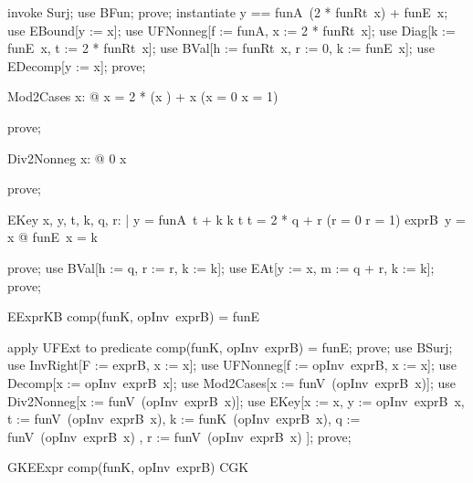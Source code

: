 \documentclass{article}
\begin{document}
\begin{zproof}
invoke Surj;
use BFun;
prove;
instantiate y == funA~(2 * funRt~x) + funE~x;
use EBound[y := x];
use UFNonneg[f := funA, x := 2 * funRt~x];
use Diag[k := funE~x, t := 2 * funRt~x];
use BVal[h := funRt~x, r := 0, k := funE~x];
use EDecomp[y := x];
prove;
\end{zproof}

\begin{theorem}{Mod2Cases}
  \forall x: \nat @ x = 2 * (x ) + x  \land (x  = 0 \lor x  = 1)
\end{theorem}

\begin{zproof}
prove;
\end{zproof}

\begin{theorem}{Div2Nonneg}
  \forall x: \nat @ 0 \leq x 
\end{theorem}

\begin{zproof}
prove;
\end{zproof}

\begin{theorem}{EKey}
  \forall x, y, t, k, q, r: \nat | y = funA~t + k \land k \leq t \land t = 2 * q + r \land (r = 0 \lor r = 1) \land exprB~y = x @ funE~x = k
\end{theorem}

\begin{zproof}
prove;
use BVal[h := q, r := r, k := k];
use EAt[y := x, m := q + r, k := k];
prove;
\end{zproof}

\begin{theorem}{EExprKB}
  comp(funK, opInv~exprB) = funE
\end{theorem}

\begin{zproof}
apply UFExt to predicate comp(funK, opInv~exprB) = funE;
prove;
use BSurj;
use InvRight[F := exprB, x := x];
use UFNonneg[f := opInv~exprB, x := x];
use Decomp[x := opInv~exprB~x];
use Mod2Cases[x := funV~(opInv~exprB~x)];
use Div2Nonneg[x := funV~(opInv~exprB~x)];
use EKey[x := x, y := opInv~exprB~x, t := funV~(opInv~exprB~x), k := funK~(opInv~exprB~x), q := funV~(opInv~exprB~x) , r := funV~(opInv~exprB~x) ];
prove;
\end{zproof}

\begin{theorem}{GKEExpr}
  comp(funK, opInv~exprB) \in CGK
\end{theorem}
\end{document}
